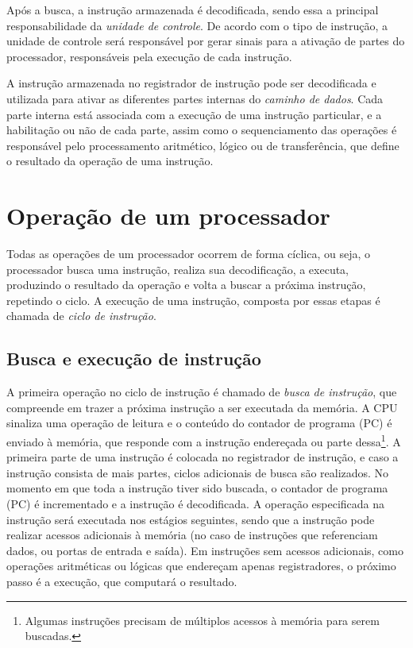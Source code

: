 \documentclass[11pt,a4paper]{report}
\begin{document}
Após a busca, a instrução armazenada é decodificada, sendo essa a
principal responsabilidade da \textit{unidade de controle}. De acordo
com o tipo de instrução, a unidade de controle será responsável por
gerar sinais para a ativação de partes do processador, responsáveis
pela execução de cada instrução.

A instrução armazenada no registrador de instrução pode ser decodificada
e utilizada para ativar as diferentes partes internas do \textit{caminho
de dados}. Cada parte interna está associada com a execução de uma
instrução particular, e a habilitação ou não de cada parte, assim como
o sequenciamento das operações é responsável pelo processamento aritmético,
lógico ou de transferência, que define o resultado da operação de uma
instrução.

\section{Operação de um processador}

Todas as operações de um processador ocorrem de forma cíclica, ou seja,
o processador busca uma instrução, realiza sua decodificação, a executa,
produzindo o resultado da operação e volta a buscar a próxima instrução,
repetindo o ciclo. A execução de uma instrução, composta por essas etapas
é chamada de \textit{ciclo de instrução}.

\subsection{Busca e execução de instrução}

A primeira operação no ciclo de instrução é chamado de \textit{busca de
instrução}, que compreende em trazer a próxima instrução a ser executada
da memória. A CPU sinaliza uma operação de leitura e o conteúdo do 
contador de programa (PC) é enviado à memória, que responde com a
instrução endereçada ou parte dessa\footnote{Algumas instruções precisam
de múltiplos acessos à memória para serem buscadas.}. A primeira parte
de uma instrução é colocada no registrador de instrução, e caso a
instrução consista de mais partes, ciclos adicionais de busca são
realizados. No momento em que toda a instrução tiver sido buscada, o
contador de programa (PC) é incrementado e a instrução é decodificada. A
operação especificada na instrução será executada nos estágios seguintes,
sendo que a instrução pode realizar acessos adicionais à memória (no 
caso de instruções que referenciam dados, ou portas de entrada e saída).
Em instruções sem acessos adicionais, como operações aritméticas ou 
lógicas que endereçam apenas registradores, o próximo passo é a execução,
que computará o resultado.
\end{document}
